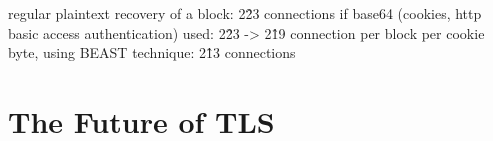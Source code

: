 \documentclass[10pt,conference,a4paper]{IEEEtran}
\begin{document}
regular plaintext recovery of a block: 2\^23 connections
if base64 (cookies, http basic access authentication) used: 2\^23 -> 2\^19 connection per block
per cookie byte, using BEAST technique: 2\^13 connections

\section{The Future of TLS}
\label{sec:future}


%

\end{document}
